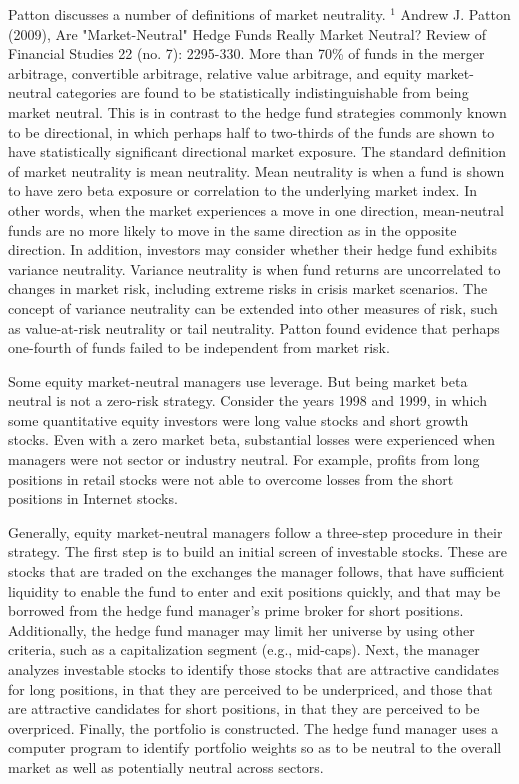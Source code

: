 \documentclass[11pt]{article}
\begin{document}
Patton discusses a number of definitions of market neutrality. ${ }^{1}$ Andrew J. Patton (2009), Are "Market-Neutral" Hedge Funds Really Market Neutral? Review of Financial Studies 22 (no. 7): 2295-330. More than 70\% of funds in the merger arbitrage, convertible arbitrage, relative value arbitrage, and equity market-neutral categories are found to be statistically indistinguishable from being market neutral. This is in contrast to the hedge fund strategies commonly known to be directional, in which perhaps half to two-thirds of the funds are shown to have statistically significant directional market exposure. The standard definition of market neutrality is mean neutrality. Mean neutrality is when a fund is shown to have zero beta exposure or correlation to the underlying market index. In other words, when the market experiences a move in one direction, mean-neutral funds are no more likely to move in the same direction as in the opposite direction. In addition, investors may consider whether their hedge fund exhibits variance neutrality. Variance neutrality is when fund returns are uncorrelated to changes in market risk, including extreme risks in crisis market scenarios. The concept of variance neutrality can be extended into other measures of risk, such as value-at-risk neutrality or tail neutrality. Patton found evidence that perhaps one-fourth of funds failed to be independent from market risk.

Some equity market-neutral managers use leverage. But being market beta neutral is not a zero-risk strategy. Consider the years 1998 and 1999, in which some quantitative equity investors were long value stocks and short growth stocks. Even with a zero market beta, substantial losses were experienced when managers were not sector or industry neutral. For example, profits from long positions in retail stocks were not able to overcome losses from the short positions in Internet stocks.

Generally, equity market-neutral managers follow a three-step procedure in their strategy. The first step is to build an initial screen of investable stocks. These are stocks that are traded on the exchanges the manager follows, that have sufficient liquidity to enable the fund to enter and exit positions quickly, and that may be borrowed from the hedge fund manager's prime broker for short positions. Additionally, the hedge fund manager may limit her universe by using other criteria, such as a capitalization segment (e.g., mid-caps). Next, the manager analyzes investable stocks to identify those stocks that are attractive candidates for long positions, in that they are perceived to be underpriced, and those that are attractive candidates for short positions, in that they are perceived to be overpriced. Finally, the portfolio is constructed. The hedge fund manager uses a computer program to identify portfolio weights so as to be neutral to the overall market as well as potentially neutral across sectors.
\end{document}
